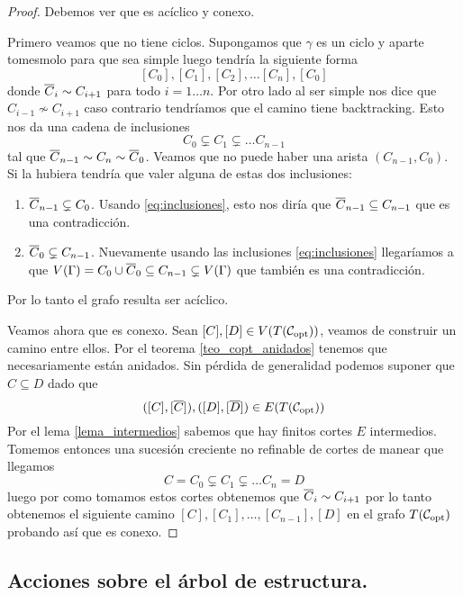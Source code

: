 \documentclass[tesis.tex]{subfiles}
\begin{document}
\begin{proof}
	Debemos ver que es acíclico y conexo.
	
	Primero veamos que no tiene ciclos.
	Supongamos que $\gamma$	es un ciclo y aparte tomesmolo para que sea simple luego tendría la siguiente forma
	\[
		[C_0], [C_1], [C_2], \dots [C_{n}], [C_0]
	\]
	donde $\overline C_{i} \sim C_{i+1}$ para todo $i=1 \dots n$.
	Por otro lado al ser simple nos dice que $C_{i-1} \nsim C_{i+1}$ caso contrario tendríamos que el camino tiene backtracking.
	Esto nos da una cadena de inclusiones
	\begin{equation}\label{eq:inclusiones}
			C_0 \subsetneq C_1 \subsetneq \dots C_{n-1}
	\end{equation}
	tal que $\overline C_{n-1} \sim C_n \sim \overline C_0$.
	Veamos que no puede haber una arista $(C_{n-1}, C_0)$.
	Si la hubiera tendría que valer alguna de estas dos inclusiones:
	\begin{enumerate}
		\item $\overline C_{n-1} \subsetneq C_0$.
		Usando \ref{eq:inclusiones}, esto nos diría que $\overline C_{n-1} \subseteq C_{n-1}$ que es una contradicción.
		\item $\overline C_{0} \subsetneq C_{n-1}$.
		Nuevamente usando las inclusiones \ref{eq:inclusiones} llegaríamos a que $V(\Gamma) = C_0 \cup \overline C_0 \subseteq C_{n-1} \subsetneq V(\Gamma)$ que también es una contradicción.
	\end{enumerate}
	Por lo tanto el grafo resulta ser acíclico.
	
	Veamos ahora que es conexo.
	Sean $[C], [D] \in V(T({\cal C}_{\text{opt}}))$, veamos de construir un camino entre ellos.
	Por el teorema \ref{teo_copt_anidados} tenemos que necesariamente están anidados.
	Sin pérdida de generalidad podemos suponer que $C \subseteq D$ dado que
	\[
	([C], [\overline C]), ([D],[\overline D]) \in E(T({\cal C}_{\text{opt}}))
	\]
	Por el lema \ref{lema_intermedios} sabemos que hay finitos cortes $E$ intermedios.
	Tomemos entonces una sucesión creciente no refinable de cortes de manear que llegamos 
	\[
		C=C_0 \subsetneq C_1 \subsetneq \dots C_n = D
	\]
	luego por como tomamos estos cortes obtenemos que $\overline C_i \sim C_{i+1}$ por lo tanto obtenemos el siguiente camino $[C],[C_1], \dots, [C_{n-1}],[D]$ en el grafo $T({\cal C}_{\text{opt}})$ probando así que es conexo.	
\end{proof}

\subsection{Acciones sobre el árbol de estructura.}
\end{document}
